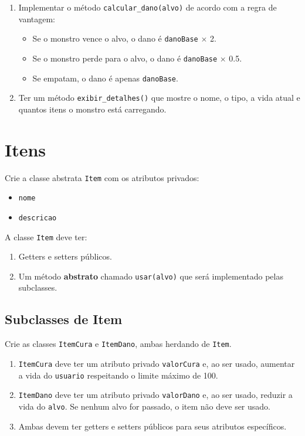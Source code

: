 \documentclass{article}
\begin{document}
\begin{enumerate}
    \item Implementar o método \texttt{calcular\_dano(alvo)} de acordo com a regra de vantagem:
          \begin{itemize}
              \item Se o monstro vence o alvo, o dano é \texttt{danoBase} $\times$ 2.
              \item Se o monstro perde para o alvo, o dano é \texttt{danoBase} $\times$ 0.5.
              \item Se empatam, o dano é apenas \texttt{danoBase}.
          \end{itemize}
    \item Ter um método \texttt{exibir\_detalhes()} que mostre o nome, o tipo, a vida atual
          e quantos itens o monstro está carregando.
\end{enumerate}

\section{Itens}

Crie a classe abstrata \texttt{Item} com os atributos privados:

\begin{itemize}
    \item \texttt{nome}
    \item \texttt{descricao}
\end{itemize}

A classe \texttt{Item} deve ter:

\begin{enumerate}
    \item Getters e setters públicos.
    \item Um método \textbf{abstrato} chamado \texttt{usar(alvo)} que será
          implementado pelas subclasses.
\end{enumerate}

\subsection{Subclasses de Item}

Crie as classes \texttt{ItemCura} e \texttt{ItemDano}, ambas herdando de \texttt{Item}.

\begin{enumerate}
    \item \texttt{ItemCura} deve ter um atributo privado \texttt{valorCura} e, ao ser usado,
          aumentar a vida do \texttt{usuario} respeitando o limite máximo de 100.
    \item \texttt{ItemDano} deve ter um atributo privado \texttt{valorDano} e, ao ser usado,
          reduzir a vida do \texttt{alvo}. Se nenhum alvo for passado, o item não deve ser usado.
    \item Ambas devem ter getters e setters públicos para seus atributos específicos.
\end{enumerate}
\end{document}
